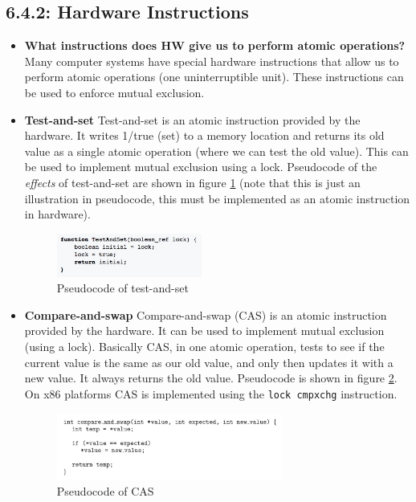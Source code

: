 \documentclass[12pt]{article}
\begin{document}
\subsection*{6.4.2: Hardware Instructions}

\begin{itemize}
    \item \textbf{What instructions does HW give us to perform atomic operations?} Many computer systems have special hardware instructions that allow us to perform atomic operations (one uninterruptible unit). These instructions can be used to enforce mutual exclusion.
    \item \textbf{Test-and-set} Test-and-set is an atomic instruction provided by the hardware. It writes 1/true (set) to a memory location and returns its old value as a single atomic operation (where we can test the old value). This can be used to implement mutual exclusion using a lock. Pseudocode of the \textit{effects} of test-and-set are shown in figure \ref{fig:test-and-set} (note that this is just an illustration in pseudocode, this must be implemented as an atomic instruction in hardware).
    \begin{figure}[ht]
        \centering
        \includegraphics[width=0.45\textwidth]{figures/test-and-set.jpg}
        \caption{Pseudocode of test-and-set}
        \label{fig:test-and-set}
    \end{figure}
\item \textbf{Compare-and-swap} Compare-and-swap (CAS) is an atomic instruction provided by the hardware. It can be used to implement mutual exclusion (using a lock). Basically CAS, in one atomic operation, tests to see if the current value is the same as our old value, and only then updates it with a new value. It always returns the old value. Pseudocode is shown in figure \ref{fig:cas}. On x86 platforms CAS is implemented using the \texttt{lock cmpxchg} instruction.
    \begin{figure}[ht]
        \centering
        \includegraphics[width=0.7\textwidth]{figures/cas.jpg}
        \caption{Pseudocode of CAS}
        \label{fig:cas}
    \end{figure}
\end{itemize}
\end{document}
